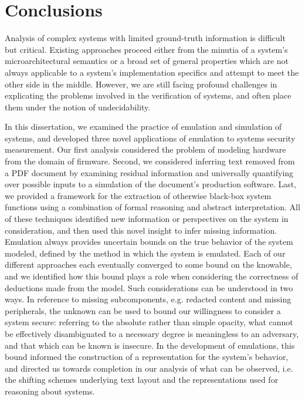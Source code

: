 \chapter{Conclusions}
\label{chap:conclusion}

Analysis of complex systems with limited ground-truth information is difficult but critical.
Existing approaches proceed either from the minutia of a system's microarchitectural semantics or a broad set of general properties which are not always applicable to a system's implementation specifics and attempt to meet the other side in the middle.
However, we are still facing profound challenges in explicating the problems involved in the verification of systems, and often place them under the notion of undecidability.

In this dissertation, we examined the practice of emulation and simulation of systems, and developed three novel applications of emulation to systems security measurement.
Our first analysis considered the problem of modeling hardware from the domain of firmware.
Second, we considered inferring text removed from a PDF document by examining residual information and universally quantifying over possible inputs to a simulation of the document's production software.
Last, we provided a framework for the extraction of otherwise black-box system functions using a combination of formal reasoning and abstract interpretation.
All of these techniques identified new information or perspectives on the system in consideration, and then used this novel insight to infer missing information.
Emulation always provides uncertain bounds on the true behavior of the system modeled, defined by the method in which the system is emulated.
Each of our different approaches each eventually converged to some bound on the knowable, and we identified how this bound plays a role when considering the correctness of deductions made from the model.
Such considerations can be understood in two ways.
In reference to missing subcomponents, e.g. redacted content and missing peripherals, the unknown can be used to bound our willingness to consider a system secure: referring to the absolute rather than simple opacity, what cannot be effectively disambiguated to a necessary degree is meaningless to an adversary, and that which can be known is insecure.
In the development of emulations, this bound informed the construction of a representation for the system's behavior, and directed us towards completion in our analysis of what can be observed, i.e. the shifting schemes underlying text layout and the representations used for reasoning about systems.

